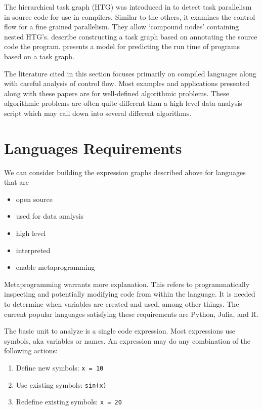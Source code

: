 \documentclass[12pt]{article}
\begin{document}
The hierarchical task graph (HTG) was introduced in \cite{girkar1992automatic}
to detect task parallelism in source code for use in compilers.
Similar to the others, it examines the control flow for a fine grained
parallelism. They allow `compound nodes' containing nested HTG's.
\cite{cosnard1995automatic} describe constructing a task graph based on
annotating the source code the program.
\cite{adve2004parallel} presents a model for predicting the run time of
programs based on a task graph. 

The literature cited in this section focuses primarily on compiled
languages along with careful analysis of control flow. Most examples and
applications presented along with these papers are for well-defined
algorithmic problems. These algorithmic problems are often quite different
than a high level data analysis script which may call down into several
different algorithms.

\section{Languages Requirements}

We can consider building the expression graphs described above for languages that are
\begin{itemize}
    \item open source
    \item used for data analysis
    \item high level
    \item interpreted
    \item enable metaprogramming
\end{itemize}
Metaprogramming warrants more explanation. This refers to programmatically
inspecting and potentially modifying code from within the language.  It is
needed to determine when variables are created and used, among other
things.  The current popular languages satisfying these requirements are
Python, Julia, and R.

The basic unit to analyze is a single code expression.
Most expressions use symbols, aka variables or names.
An expression may do any combination of the following actions:
\begin{enumerate}
    \item Define new symbols: \texttt{x = 10}
    \item Use existing symbols: \texttt{sin(x)}
    \item Redefine existing symbols: \texttt{x = 20}
\end{enumerate}
\end{document}
